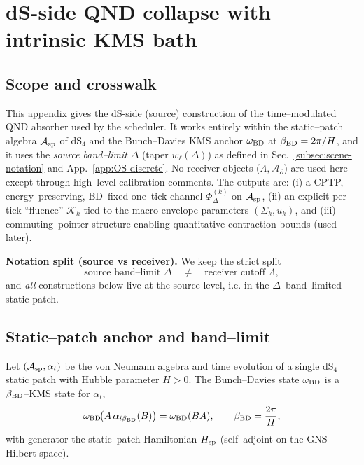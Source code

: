 \documentclass[10pt]{article}
\theoremstyle{definition}
\theoremstyle{plain}
\begin{document}
\section{dS-side QND collapse with intrinsic KMS bath}
\label{app:dS-collapse}

\subsection{Scope and crosswalk}
\label{app:dS-collapse:scope}
This appendix gives the dS-side (source) construction of the time–modulated QND absorber used by the scheduler.
It works entirely within the static–patch algebra \(\mathcal A_{\rm sp}\) of \(\mathrm{dS}_4\) and the Bunch–Davies KMS anchor
\(\omega_{\rm BD}\) at \(\beta_{\rm BD}=2\pi/H\), and it uses the \emph{source band–limit} \(\Delta\) (taper \(w_\ell(\Delta)\))
as defined in Sec.~\ref{subsec:scene-notation} and App.~\ref{app:OS-discrete}.
No receiver objects (\(\Lambda,\mathcal A_\partial\)) are used here except through high–level calibration comments.
The outputs are:
(i) a CPTP, energy–preserving, BD–fixed one–tick channel \(\Phi_\Delta^{(k)}\) on \(\mathcal A_{\rm sp}\),
(ii) an explicit per–tick ``fluence'' \(\mathcal K_k\) tied to the macro envelope parameters \((\Sigma_k,u_k)\),
and (iii) commuting–pointer structure enabling quantitative contraction bounds (used later).

\medskip
\noindent\textbf{Notation split (source vs receiver).}
We keep the strict split
\[
\text{source band–limit } \Delta \quad\neq\quad \text{receiver cutoff } \Lambda,
\]
and \emph{all} constructions below live at the source level, i.e. in the \(\Delta\)–band–limited static patch.

\subsection{Static–patch anchor and band–limit}
\label{app:dS-collapse:anchor}
Let \((\mathcal A_{\rm sp},\alpha_t)\) be the von Neumann algebra and time evolution of a single \(\mathrm{dS}_4\) static patch
with Hubble parameter \(H>0\). The Bunch–Davies state \(\omega_{\rm BD}\) is a \(\beta_{\rm BD}\)–KMS state for \(\alpha_t\),
\[
\omega_{\rm BD}\!\big(A\,\alpha_{i\beta_{\rm BD}}(B)\big)=\omega_{\rm BD}(BA),\qquad \beta_{\rm BD}=\frac{2\pi}{H},
\]
with generator the static–patch Hamiltonian \(H_{\rm sp}\) (self–adjoint on the GNS Hilbert space).
\end{document}
